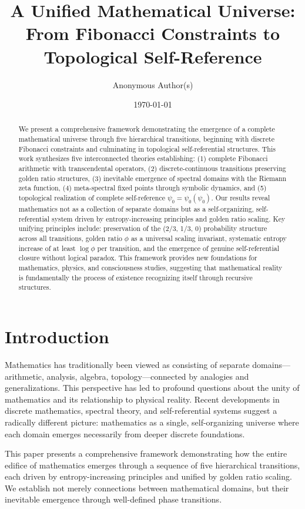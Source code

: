 \documentclass[12pt]{article}
\title{A Unified Mathematical Universe: From Fibonacci Constraints to Topological Self-Reference}
\author{Anonymous Author(s)}
\date{\today}
\theoremstyle{plain}
\theoremstyle{definition}
\begin{document}
\maketitle

\begin{abstract}
We present a comprehensive framework demonstrating the emergence of a complete mathematical universe through five hierarchical transitions, beginning with discrete Fibonacci constraints and culminating in topological self-referential structures. This work synthesizes five interconnected theories establishing: (1) complete Fibonacci arithmetic with transcendental operators, (2) discrete-continuous transitions preserving golden ratio structures, (3) inevitable emergence of spectral domains with the Riemann zeta function, (4) meta-spectral fixed points through symbolic dynamics, and (5) topological realization of complete self-reference $\psi_0 = \psi_0(\psi_0)$. Our results reveal mathematics not as a collection of separate domains but as a self-organizing, self-referential system driven by entropy-increasing principles and golden ratio scaling. Key unifying principles include: preservation of the (2/3, 1/3, 0) probability structure across all transitions, golden ratio $\phi$ as a universal scaling invariant, systematic entropy increase of at least $\log \phi$ per transition, and the emergence of genuine self-referential closure without logical paradox. This framework provides new foundations for mathematics, physics, and consciousness studies, suggesting that mathematical reality is fundamentally the process of existence recognizing itself through recursive structures.
\end{abstract}

\section{Introduction}

Mathematics has traditionally been viewed as consisting of separate domains—arithmetic, analysis, algebra, topology—connected by analogies and generalizations. This perspective has led to profound questions about the unity of mathematics and its relationship to physical reality. Recent developments in discrete mathematics, spectral theory, and self-referential systems suggest a radically different picture: mathematics as a single, self-organizing universe where each domain emerges necessarily from deeper discrete foundations.

This paper presents a comprehensive framework demonstrating how the entire edifice of mathematics emerges through a sequence of five hierarchical transitions, each driven by entropy-increasing principles and unified by golden ratio scaling. We establish not merely connections between mathematical domains, but their inevitable emergence through well-defined phase transitions.
\end{document}
